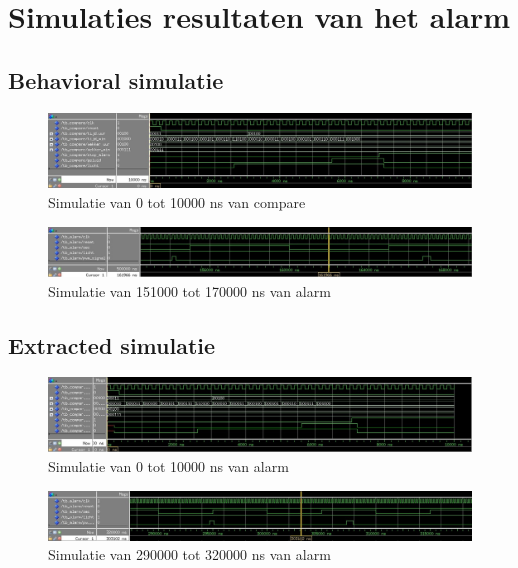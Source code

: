 \chapter[Simulatie resultaten Alarm]{Simulaties resultaten van het alarm}
\label{Ap:sim_alarm}
\section{Behavioral simulatie}
\begin{figure}[ht!]
\includegraphics[width=\textwidth,height=\textheight,keepaspectratio]{Figuren/Alarm/Compare_beh.jpg}
\caption{Simulatie van 0 tot 10000 ns van compare}
\label{fig:sim_beh_compare}
\end{figure}
\begin{figure}[ht!]
\includegraphics[width=\textwidth,height=\textheight,keepaspectratio]{Figuren/Alarm/Alarm_beh.jpg}
\caption{Simulatie van 151000 tot 170000 ns van alarm}
\label{fig:sim_beh_alarm}
\end{figure}
\newpage
\section{Extracted simulatie}
\begin{figure}[ht!]
\includegraphics[width=\textwidth,height=\textheight,keepaspectratio]{Figuren/Alarm/Compare_ext.jpg}
\caption{Simulatie van 0 tot 10000 ns van alarm}
\label{fig:sim_ext_compare}
\end{figure}
\begin{figure}[ht!]
\includegraphics[width=\textwidth,height=\textheight,keepaspectratio]{Figuren/Alarm/Alarm_ext.jpg}
\caption{Simulatie van 290000 tot 320000 ns van alarm}
\label{fig:sim_ext_alarm}
\end{figure}


